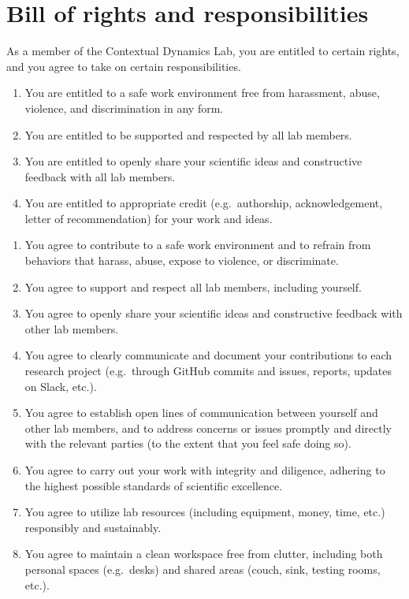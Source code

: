 \documentclass{tufte-book} %
\begin{document}
\chapter{Bill of rights and responsibilities}\label{ch:billofrights}
  As a member of the
Contextual Dynamics Lab, you are entitled to certain rights, and you
agree to take on certain responsibilities.


\begin{enumerate}
\item You are entitled to a safe work environment free from
  harassment, abuse, violence, and discrimination in any form.
  \item You are entitled to be supported and respected by all lab
    members.
  \item You are entitled to openly share your scientific ideas and
    constructive feedback with all lab members.
  \item You are entitled to appropriate credit (e.g.\ authorship,
    acknowledgement, letter of recommendation) for your work and
    ideas.
\end{enumerate}

\begin{enumerate}
  \item You agree to contribute to a safe work environment and to refrain
    from behaviors that harass, abuse, expose to violence, or
    discriminate.
  \item You agree to support and respect all lab members, including
    yourself.
  \item You agree to openly share your scientific ideas and constructive
    feedback with other lab members.
  \item You agree to clearly communicate and document your
    contributions to each research project (e.g.\ through GitHub
    commits and issues, reports, updates on Slack, etc.).
  \item You agree to establish open lines of communication between
    yourself and other lab members, and to address concerns or issues
    promptly and directly with the relevant parties (to the extent
    that you feel safe doing so).
  \item You agree to carry out your work with integrity and diligence,
    adhering to the highest possible standards of scientific
    excellence.
  \item You agree to utilize lab resources (including equipment,
    money, time, etc.) responsibly and sustainably.
  \item You agree to maintain a clean workspace free from clutter,
    including both personal spaces (e.g.\  desks) and shared
    areas (couch, sink, testing rooms, etc.).
\end{enumerate}
\end{document}
